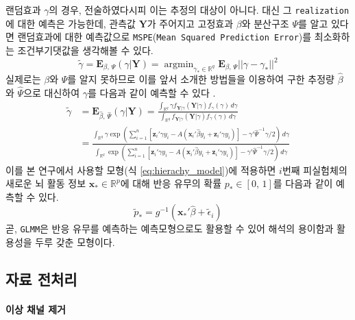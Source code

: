 \documentclass[11pt,onecolumn,twoside,a4size]{gsag3jnl}
\DeclareMathOperator*{\argmin}{argmin}
\begin{document}
랜덤효과 $\gamma$의 경우, 전술하였다시피 이는 추정의 대상이 아니다. 대신 그 \texttt{realization}에 대한 예측은 가능한데, 관측값 $\mathbf{Y}$가 주어지고 고정효과 $\beta$와 분산구조 $\Psi$를 알고 있다면 랜덤효과에 대한 예측값으로 \texttt{MSPE}(\texttt{Mean Squared Prediction Error})를 최소화하는 조건부기댓값을 생각해볼 수 있다.
\begin{equation}
  \widetilde{\gamma}=\mathbf{E}_{\beta,\,\Psi}(\gamma\vert\mathbf{Y})=\argmin_{\gamma_*\in\mathbb{R}^q}\mathbf{E}_{\beta,\,\Psi}||\gamma-\gamma_*||^2
\end{equation}
실제로는 $\beta$와 $\Psi$를 알지 못하므로 이를 앞서 소개한 방법들을 이용하여 구한 추정량 $\widehat{\beta}$와 $\widehat{\Psi}$으로 대신하여 $\gamma$를 다음과 같이 예측할 수 있다 \texttt{\citep{mcculloch2011prediction}}.
\begin{align}
  \widetilde{\gamma}&=\mathbf{E}_{\widehat{\beta},\,\widehat{\Psi}}(\gamma\vert\mathbf{Y})=\frac{\int_{\mathbb{R}^q}\gamma f_{\mathbf{Y}\vert\gamma}(\mathbf{Y}\vert\gamma)f_\gamma(\gamma)\,d\gamma}{\int_{\mathbb{R}^q}f_{\mathbf{Y}\vert\gamma}(\mathbf{Y}\vert\gamma)f_\gamma(\gamma)\,d\gamma}\\
  &=\frac{\int_{\mathbb{R}^q}\gamma\exp(\sum_{i=1}^n[\mathbf{z}_i'\gamma y_i-A(\mathbf{x}_i'\widehat{\beta} y_i+\mathbf{z}_i'\gamma y_i)]-\gamma'\widehat{\Psi}^{-1}\gamma/2)\,d\gamma}{\int_{\mathbb{R}^q}\exp(\sum_{i=1}^n[\mathbf{z}_i'\gamma y_i-A(\mathbf{x}_i'\widehat{\beta} y_i+\mathbf{z}_i'\gamma y_i)]-\gamma'\widehat{\Psi}^{-1}\gamma/2)\,d\gamma}\nonumber
\end{align}
이를 본 연구에서 사용할 모형(식 \ref{eq:hierachy_model})에 적용하면 $i$번째 피실험체의 새로운 뇌 활동 정보 $\mathbf{x}_*\in\mathbb{R}^p$에 대해 반응 유무의 확률 $p_*\in[0,\,1]$를 다음과 같이 예측할 수 있다.
\begin{equation}
  \widetilde{p}_*=g^{-1}(\mathbf{x}_*'\widehat{\beta}+\widetilde{\epsilon}_i)
\end{equation}
곧, \texttt{GLMM}은 반응 유무를 예측하는 예측모형으로도 활용할 수 있어 해석의 용이함과 활용성을 두루 갖춘 모형이다.

\subsection{자료 전처리}
\paragraph{이상 채널 제거}
\end{document}
